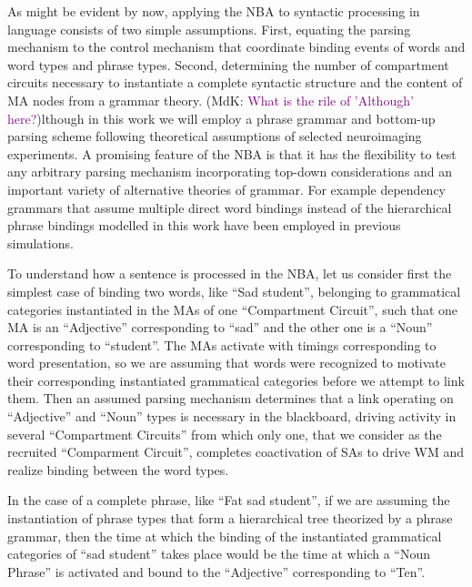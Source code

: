\documentclass[10pt]{article}
\newcommand{\notenewMdK}[2]{(MdK: \textcolor{purple}{#1})}
\begin{document}
As might be evident by now, applying the NBA to syntactic processing in language consists of two simple assumptions.
First, equating the parsing mechanism to the control mechanism that coordinate binding events of words and word types and phrase types.
Second, determining the number of compartment circuits necessary to instantiate a complete syntactic structure and the content of MA nodes from a grammar theory.
\notenewMdK{What is the rile of 'Although' here?}
Although in this work we will employ a phrase grammar and bottom-up parsing scheme following theoretical assumptions of selected neuroimaging experiments.
A promising feature of the NBA is that it has the flexibility to test any arbitrary parsing mechanism incorporating top-down considerations and an important variety of alternative theories of grammar.
For example dependency grammars that assume multiple direct word bindings instead of the hierarchical phrase bindings modelled in this work have been employed in previous simulations\cite{van_der_Velde_2010}.

To understand how a sentence is processed in the NBA, let us consider first the simplest case of binding two words, like ``Sad student'', 
belonging to grammatical categories instantiated in the MAs of one ``Compartment Circuit'', such that one MA is an ``Adjective'' corresponding to ``sad'' and the other one 
is a ``Noun'' corresponding to ``student''.
The MAs activate with timings corresponding to word presentation, so we are assuming that words were recognized to motivate their corresponding instantiated grammatical 
categories before we attempt to link them.
Then an assumed parsing mechanism determines that a link operating on ``Adjective'' and ``Noun'' types is necessary in the blackboard, driving activity in several 
``Compartment Circuits'' from which only one, that we consider as the recruited ``Comparment Circuit'', completes coactivation of SAs to drive WM and realize binding between the word types.

In the case of a complete phrase, like ``Fat sad student'', if we are assuming the instantiation of phrase types that form a hierarchical tree theorized by a phrase grammar, 
then the time at which the binding of the instantiated grammatical categories of ``sad student'' takes place would be the time at which a ``Noun Phrase'' is activated and bound 
to the ``Adjective'' corresponding to ``Ten''.
\end{document}
